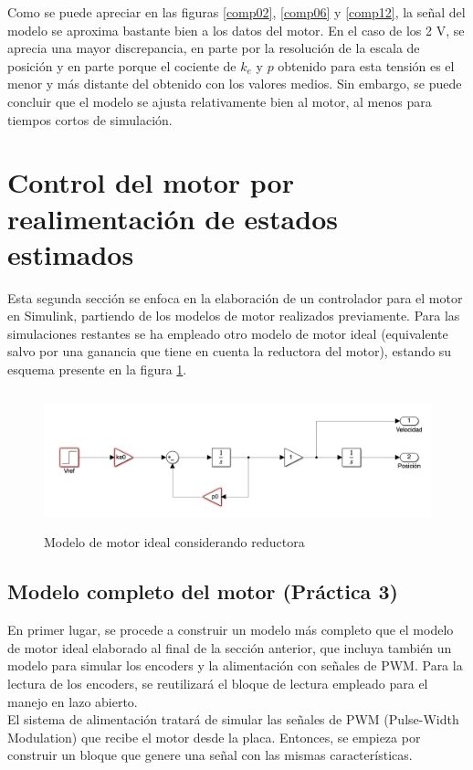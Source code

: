 \documentclass[a4paper, 12pt]{article}
\begin{document}
\newpage
Como se puede apreciar en las figuras \ref{comp02}, \ref{comp06} y \ref{comp12}, la señal del modelo se aproxima bastante bien a los datos del motor. En el caso de los 2 V, se aprecia una mayor discrepancia, en parte por la resolución de la escala de posición y en parte porque el cociente de $k_e$ y $p$ obtenido para esta tensión es el menor y más distante del obtenido con los valores medios. Sin embargo, se puede concluir que el modelo se ajusta relativamente bien al motor, al menos para tiempos cortos de simulación. 

\section{Control del motor por realimentación de estados estimados}
Esta segunda sección se enfoca en la elaboración de un controlador para el motor en Simulink, partiendo de los modelos de motor realizados previamente. 
Para las simulaciones restantes se ha empleado otro modelo de motor ideal (equivalente salvo por una ganancia que tiene en cuenta la reductora del motor), estando su esquema presente en la figura \ref{ideal2}.

\begin{figure}[h!]
	\centering
	\includegraphics[height=4cm]{ideal2}
	\caption{Modelo de motor ideal considerando reductora} \label{ideal2}
\end{figure}
\subsection{Modelo completo del motor (Práctica 3)}
En primer lugar, se procede a construir un modelo más completo que el modelo de motor ideal elaborado al final de la sección anterior, que incluya también un modelo para simular los encoders y la alimentación con señales de PWM. 
Para la lectura de los encoders, se reutilizará el bloque de lectura empleado para el manejo en lazo abierto. \\

El sistema de alimentación tratará de simular las señales de PWM (Pulse-Width Modulation) que recibe el motor desde la placa. Entonces, se empieza por construir un bloque que genere una señal con las mismas características. \\
\end{document}
